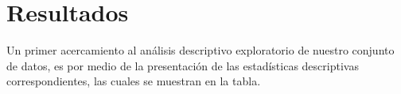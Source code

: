 \documentclass[conference]{IEEEtran}
\begin{document}
\section{Resultados}

Un primer acercamiento al análisis descriptivo exploratorio de nuestro conjunto de datos, es por medio de la presentación de las estadísticas descriptivas correspondientes, las cuales se muestran en la tabla.

\end{document}
